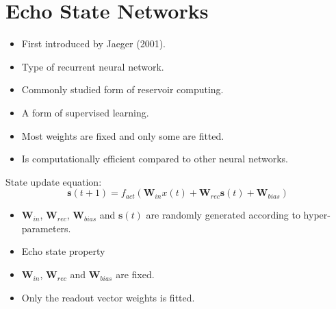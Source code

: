 
\chapter{Echo State Networks}


    \begin{itemize}
        \item First introduced by Jaeger (2001). %
        \item Type of recurrent neural network.
        \item Commonly studied form of reservoir computing.
        \item A form of supervised learning.
        \item Most weights are fixed and only some are fitted.
        \item Is computationally efficient compared to other neural networks.
    \end{itemize}

    








    State update equation:
    \[
        \mathbf{s}(t + 1) = f_{act}(\mathbf{W}_{in}x(t) + \mathbf{W}_{rec}\mathbf{s}(t) + \mathbf{W}_{bias})
    \]
    \begin{itemize}
        \item $\mathbf{W}_{in}$, $\mathbf{W}_{rec}$, $\mathbf{W}_{bias}$ and $\mathbf{s}(t)$ are randomly generated according to hyper-parameters.
        \item Echo state property
        \item $\mathbf{W}_{in}$, $\mathbf{W}_{rec}$ and $\mathbf{W}_{bias}$ are fixed.
        \item Only the readout vector weights is fitted. %
    \end{itemize}

